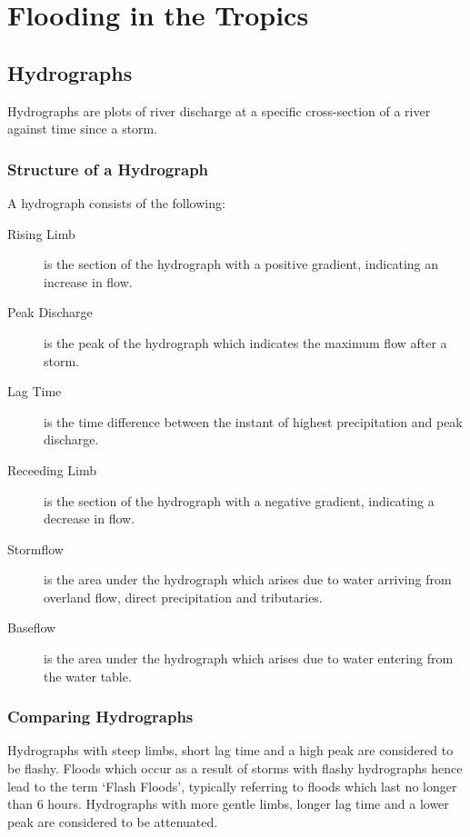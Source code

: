 \documentclass[../../main]{subfiles}
\begin{document}
\section{Flooding in the Tropics}

\subsection{Hydrographs}

	Hydrographs are plots of river discharge at a specific cross-section of a river against time since a storm. 

\subsubsection{Structure of a Hydrograph}

	A hydrograph consists of the following:

	\begin{description}
		\item[Rising Limb] is the section of the hydrograph with a positive gradient, indicating an increase in flow.
		\item[Peak Discharge] is the peak of the hydrograph which indicates the maximum flow after a storm.
		\item[Lag Time] is the time difference between the instant of highest precipitation and peak discharge.
		\item[Receeding Limb] is the section of the hydrograph with a negative gradient, indicating a decrease in flow.
		\item[Stormflow] is the area under the hydrograph which arises due to water arriving from overland flow, direct precipitation and tributaries.
		\item[Baseflow] is the area under the hydrograph which arises due to water entering from the water table.
	\end{description}

\subsubsection{Comparing Hydrographs}

	Hydrographs with steep limbs, short lag time and a high peak are considered to be flashy. Floods which occur as a result of storms with flashy hydrographs hence lead to the term `Flash Floods', typically referring to floods which last no longer than 6 hours. Hydrographs with more gentle limbs, longer lag time and a lower peak are considered to be attenuated.
\end{document}
